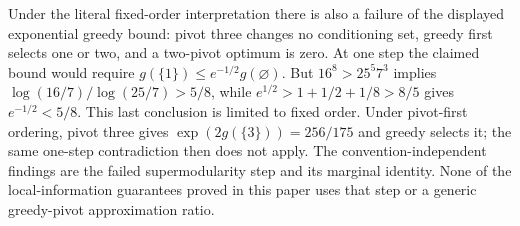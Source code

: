 Under the literal fixed-order interpretation there is also a failure of
the displayed exponential greedy bound: pivot three changes no conditioning
set, greedy first selects one or two, and a two-pivot optimum is zero.
At one step the claimed bound would require
$g(\{1\})\le e^{-1/2}g(\varnothing)$.
But $16^8>25^5 7^3$ implies
$\log(16/7)/\log(25/7)>5/8$, while
$e^{1/2}>1+1/2+1/8>8/5$ gives $e^{-1/2}<5/8$.
This last conclusion is limited to fixed order. Under pivot-first
ordering, pivot three gives $\exp(2g(\{3\}))=256/175$ and greedy selects
it; the same one-step contradiction then does not apply. The
convention-independent findings are the failed supermodularity step and its
marginal identity. None of the local-information guarantees proved in this paper
uses that step or a generic greedy-pivot approximation ratio.

